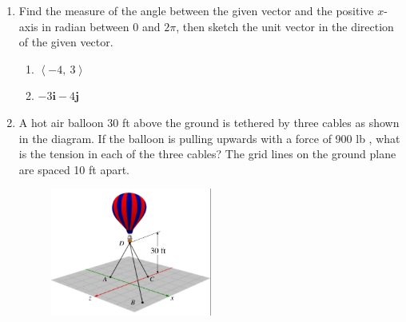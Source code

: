 \documentclass[10pt]{article}
\title{}
\date{}
\newcommand{\inpr}[1]{\left\langle#1\right\rangle}
\begin{document}
\begin{enumerate}
\item
Find the measure of the angle between the given vector and the positive $x$-axis in radian between $0$ and $2\pi$, then sketch the unit vector in the direction of the given vector.
\begin{enumerate}
\item $\inpr{-4,\ 3}$
\item $-3\mathbf i - 4\mathbf j$ 
\end{enumerate}
\clearpage
\item A hot air balloon 30 ft above the ground is tethered by three cables as shown in the diagram. If the balloon is pulling upwards with a force of 900 lb ,
what is the tension in each of the three cables? The grid lines on the ground plane are spaced 10 ft apart.
\begin{figure}[h]
\includegraphics[width = 0.5\textwidth, right]{ballon.png}
\end{figure}
\end{enumerate}
\end{document}
